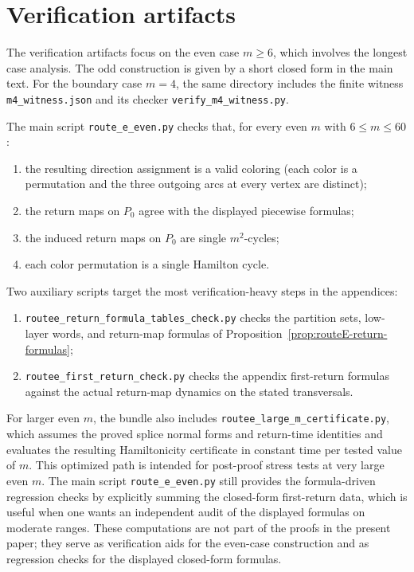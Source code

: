 \documentclass[11pt]{article}
\begin{document}
\section{Verification artifacts}\label{app:verification}

The verification artifacts focus on the even case $m\ge 6$, which involves the longest case analysis.
The odd construction is given by a short closed form in the main text.
For the boundary case $m=4$, the same directory includes the finite witness \texttt{m4\_witness.json} and its checker \texttt{verify\_m4\_witness.py}.

The main script \texttt{route\_e\_even.py} checks that, for every even $m$ with $6\le m\le 60$:
\begin{enumerate}[leftmargin=2.2em]
\item the resulting direction assignment is a valid coloring (each color is a permutation and the three outgoing arcs at every vertex are distinct);
\item the return maps on $P_0$ agree with the displayed piecewise formulas;
\item the induced return maps on $P_0$ are single $m^2$-cycles;
\item each color permutation is a single Hamilton cycle.
\end{enumerate}
Two auxiliary scripts target the most verification-heavy steps in the appendices:
\begin{enumerate}[leftmargin=2.2em,label=(\alph*)]
\item \texttt{routee\_return\_formula\_tables\_check.py} checks the partition sets, low-layer words, and return-map formulas of Proposition~\ref{prop:routeE-return-formulas};
\item \texttt{routee\_first\_return\_check.py} checks the appendix first-return formulas against the actual return-map dynamics on the stated transversals.
\end{enumerate}
For larger even $m$, the bundle also includes \texttt{routee\_large\_m\_certificate.py}, which assumes the proved splice normal forms and return-time identities and evaluates the resulting Hamiltonicity certificate in constant time per tested value of $m$.
This optimized path is intended for post-proof stress tests at very large even $m$.
The main script \texttt{route\_e\_even.py} still provides the formula-driven regression checks by explicitly summing the closed-form first-return data, which is useful when one wants an independent audit of the displayed formulas on moderate ranges.
These computations are not part of the proofs in the present paper; they serve as verification aids for the even-case construction and as regression checks for the displayed closed-form formulas.
\end{document}
